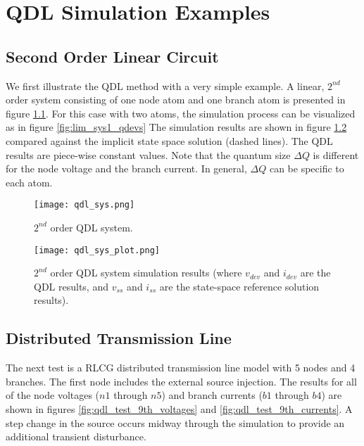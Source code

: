 
\chapter{QDL Simulation Examples}\label{chap:examples}

\section{Second Order Linear Circuit}

We first illustrate the QDL method with a very simple example. A linear, $2^{nd}$ order system consisting of one node atom and one branch atom is presented in figure \ref{fig:qdl_sys}. For this case with two atoms, the simulation process can be visualized as in figure \ref{fig:lim_sys1_qdevs} The simulation results are shown in figure \ref{fig:qdl_sys_plot} compared against the implicit state space solution (dashed lines). The QDL results are piece-wise constant values. Note that the quantum size $\Delta Q$ is different for the node voltage and the branch current. In general, $\Delta Q$ can be specific to each atom. 

\begin{figure}[htb]
    \centering
    \texttt{[image: qdl\_sys.png]}
    \caption{$2^{nd}$ order QDL system.}
    \label{fig:qdl_sys}
\end{figure}

\begin{figure}[htb]
    \centering
    \texttt{[image: qdl\_sys\_plot.png]}
    \caption{$2^{nd}$ order QDL system simulation results (where $v_{dev}$ and $i_{dev}$ are the QDL results, and $v_{ss}$ and $i_{ss}$ are the state-space reference solution results).}
    \label{fig:qdl_sys_plot}
\end{figure}

\section{Distributed Transmission Line}

The next test is a RLCG distributed transmission line model with 5 nodes and 4 branches. The first node includes the external source injection. The results for all of the node voltages ($n1$ through $n5$) and branch currents ($b1$ through $b4$) are shown in figures \ref{fig:qdl_test_9th_voltages} and \ref{fig:qdl_test_9th_currents}. A step change in the source occurs midway through the simulation to provide an additional transient disturbance.

